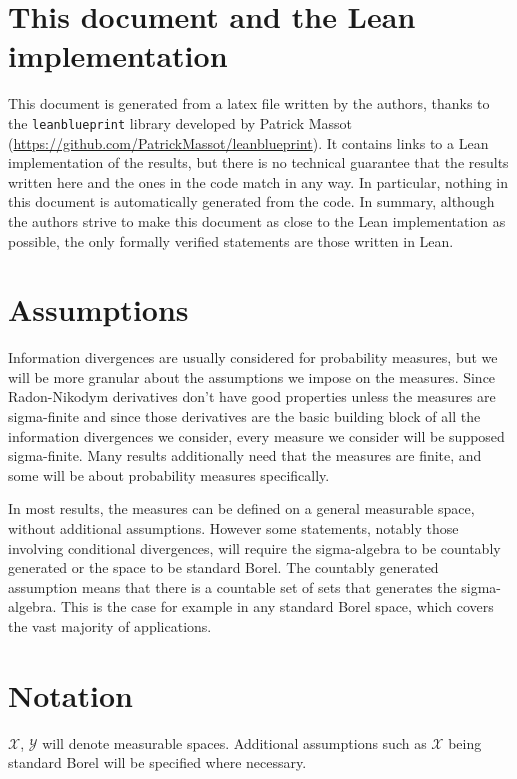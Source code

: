 \section*{This document and the Lean implementation}

This document is generated from a latex file written by the authors, thanks to the \texttt{leanblueprint} library developed by Patrick Massot (\url{https://github.com/PatrickMassot/leanblueprint}). It contains links to a Lean implementation of the results, but there is no technical guarantee that the results written here and the ones in the code match in any way.
In particular, nothing in this document is automatically generated from the code.
In summary, although the authors strive to make this document as close to the Lean implementation as possible, the only formally verified statements are those written in Lean.



\section*{Assumptions}

Information divergences are usually considered for probability measures, but we will be more granular about the assumptions we impose on the measures.
Since Radon-Nikodym derivatives don't have good properties unless the measures are sigma-finite and since those derivatives are the basic building block of all the information divergences we consider, every measure we consider will be supposed sigma-finite.
Many results additionally need that the measures are finite, and some will be about probability measures specifically.

In most results, the measures can be defined on a general measurable space, without additional assumptions.
However some statements, notably those involving conditional divergences, will require the sigma-algebra to be countably generated or the space to be standard Borel.
The countably generated assumption means that there is a countable set of sets that generates the sigma-algebra.
This is the case for example in any standard Borel space, which covers the vast majority of applications.



\section*{Notation}

$\mathcal X$, $\mathcal Y$ will denote measurable spaces. Additional assumptions such as $\mathcal X$ being standard Borel will be specified where necessary.

